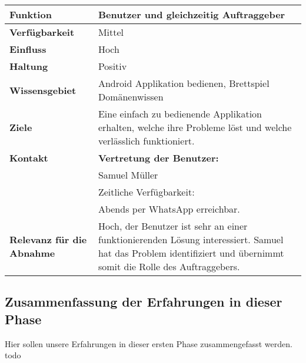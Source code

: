\begin{tabular}{p{3cm}|p{9cm}}
     {\large\textbf{Funktion}} & {\large\textbf{Benutzer und gleichzeitig Auftraggeber}} \\
     \hline
     \textbf{Verfügbarkeit} & Mittel \\
     \hline
     \textbf{Einfluss} & Hoch \\
     \hline
     \textbf{Haltung}&Positiv\\
     \hline
     \textbf{Wissensgebiet} & Android Applikation bedienen, Brettspiel Domänenwissen\\
     \hline
     \textbf{Ziele} & Eine einfach zu bedienende Applikation erhalten, welche ihre Probleme löst und welche verlässlich funktioniert.\\
     \hline
     \textbf{Kontakt} & \textbf{Vertretung der Benutzer:}\\
                &Samuel Müller  \\
                &Zeitliche Verfügbarkeit: \\
                &Abends per WhatsApp erreichbar.\\
    \hline
    \textbf{Relevanz für die Abnahme} & Hoch, der Benutzer ist sehr an einer funktionierenden Lösung interessiert. Samuel hat das Problem identifiziert und übernimmt somit die Rolle des Auftraggebers.\\

     
\end{tabular}

\subsection{Zusammenfassung der Erfahrungen in dieser Phase}
Hier sollen unsere Erfahrungen in dieser ersten Phase zusammengefasst werden.
{\color{red}todo}

\iffalse
\subsection{Anforderungsanalyse}
Dadurch, dass Samuel Teil einer festen Brettspielgruppe ist, könnte man die Mitglieder der Gruppe befragen, welche Anforderungen sie für essentiell halten und welche Anforderungen nice-to-have wären. Mit gezielten Interviews der Gruppenmitglieder können so funktionale Anforderungen erhoben werden. Die nichtfunktionalen Anforderungen können von den Entwicklern festgelegt werden, da diese über das nötige technische Knowhow verfügen.
\fi